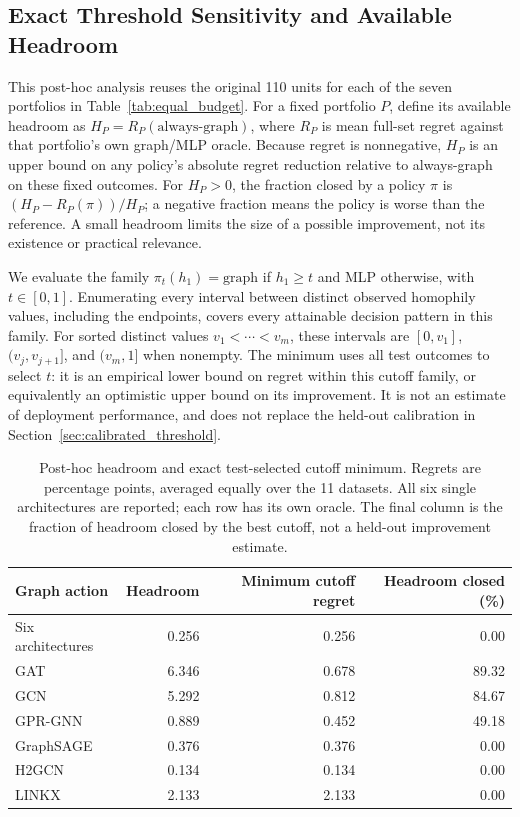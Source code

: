 \subsection{Exact Threshold Sensitivity and Available Headroom}
\label{app:threshold_headroom}

This post-hoc analysis reuses the original 110 units for each of the seven portfolios in Table~\ref{tab:equal_budget}. For a fixed portfolio $P$, define its available headroom as $H_P=R_P(\mathrm{always\mbox{-}graph})$, where $R_P$ is mean full-set regret against that portfolio's own graph/MLP oracle. Because regret is nonnegative, $H_P$ is an upper bound on any policy's absolute regret reduction relative to always-graph on these fixed outcomes. For $H_P>0$, the fraction closed by a policy $\pi$ is $(H_P-R_P(\pi))/H_P$; a negative fraction means the policy is worse than the reference. A small headroom limits the size of a possible improvement, not its existence or practical relevance.

We evaluate the family $\pi_t(h_1)=\mathrm{graph}$ if $h_1\geq t$ and MLP otherwise, with $t\in[0,1]$. Enumerating every interval between distinct observed homophily values, including the endpoints, covers every attainable decision pattern in this family. For sorted distinct values $v_1<\cdots<v_m$, these intervals are $[0,v_1]$, $(v_j,v_{j+1}]$, and $(v_m,1]$ when nonempty. The minimum uses all test outcomes to select $t$: it is an empirical lower bound on regret within this cutoff family, or equivalently an optimistic upper bound on its improvement. It is not an estimate of deployment performance, and does not replace the held-out calibration in Section~\ref{sec:calibrated_threshold}.

\begin{table}[ht]
\centering
\caption{Post-hoc headroom and exact test-selected cutoff minimum. Regrets are percentage points, averaged equally over the 11 datasets. All six single architectures are reported; each row has its own oracle. The final column is the fraction of headroom closed by the best cutoff, not a held-out improvement estimate.}
\label{tab:threshold_headroom}
\small
\setlength{\tabcolsep}{3.5pt}
\begin{tabular}{@{}lrrr@{}}
\toprule
Graph action & Headroom & Minimum cutoff regret & Headroom closed (\%) \\
\midrule
Six architectures & 0.256 & 0.256 & 0.00 \\
GAT & 6.346 & 0.678 & 89.32 \\
GCN & 5.292 & 0.812 & 84.67 \\
GPR-GNN & 0.889 & 0.452 & 49.18 \\
GraphSAGE & 0.376 & 0.376 & 0.00 \\
H2GCN & 0.134 & 0.134 & 0.00 \\
LINKX & 2.133 & 2.133 & 0.00 \\
\bottomrule
\end{tabular}
\end{table}

